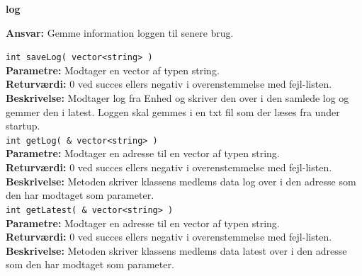 {\centering
\textbf{log}\par
}
\textbf{Ansvar:} Gemme information loggen til senere brug. \

\verb+int saveLog( vector<string> ) +\\
\textbf{Parametre:} Modtager en vector af typen string. \\
\textbf{Returværdi:} 0 ved succes ellers negativ i overenstemmelse med fejl-listen. \\
\textbf{Beskrivelse:} Modtager log fra Enhed og skriver den over i den samlede log og gemmer den i latest. Loggen skal gemmes i en txt fil som der læses fra under startup. \\

\verb+int getLog( & vector<string> ) + \\
\textbf{Parametre:} Modtager en adresse til en vector af typen string. \\
\textbf{Returværdi:} 0 ved succes ellers negativ i overenstemmelse med fejl-listen. \\
\textbf{Beskrivelse:} Metoden skriver klassens medlems data log over i den adresse som den har modtaget som parameter.\\

\verb+int getLatest( & vector<string> ) +\\
\textbf{Parametre:} Modtager en adresse til en vector af typen string.  \\
\textbf{Returværdi:} 0 ved succes ellers negativ i overenstemmelse med fejl-listen. \\
\textbf{Beskrivelse:} Metoden skriver klassens medlems data latest over i den adresse som den har modtaget som parameter.\\



